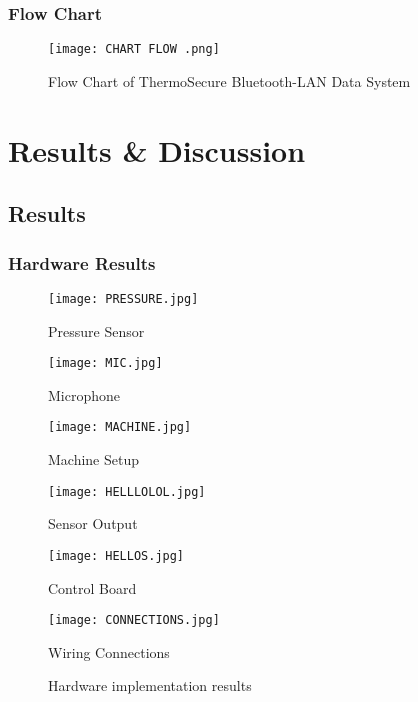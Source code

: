 \documentclass[12pt]{report}
\begin{document}
\subsection{Flow Chart}
\begin{figure}[H]
    \centering
    \texttt{[image: CHART FLOW .png]}
    \caption{Flow Chart of ThermoSecure Bluetooth-LAN Data System}
    \label{fig:flow_chart}
\end{figure}

\chapter{Results \& Discussion}
\section{Results}
\subsection{Hardware Results}

\begin{figure}[H]
\centering

\begin{minipage}{0.32\textwidth}
    \centering
    \texttt{[image: PRESSURE.jpg]}
    
    \small Pressure Sensor
\end{minipage}
\hfill
\begin{minipage}{0.32\textwidth}
    \centering
    \texttt{[image: MIC.jpg]}
    
    \small Microphone
\end{minipage}
\hfill
\begin{minipage}{0.32\textwidth}
    \centering
    \texttt{[image: MACHINE.jpg]}
    
    \small Machine Setup
\end{minipage}

\vspace{8pt}

\begin{minipage}{0.32\textwidth}
    \centering
    \texttt{[image: HELLLOLOL.jpg]}
    
    \small Sensor Output
\end{minipage}
\hfill
\begin{minipage}{0.32\textwidth}
    \centering
    \texttt{[image: HELLOS.jpg]}
    
    \small Control Board
\end{minipage}
\hfill
\begin{minipage}{0.32\textwidth}
    \centering
    \texttt{[image: CONNECTIONS.jpg]}
    
    \small Wiring Connections
\end{minipage}

\caption{Hardware implementation results}
\label{fig:hardware_results}
\end{figure}
\end{document}
